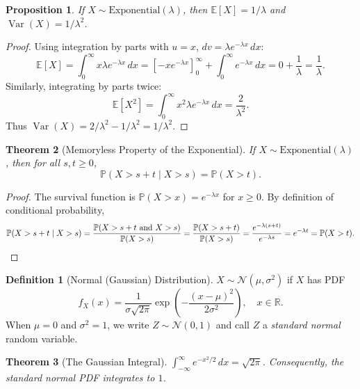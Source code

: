 \documentclass[11pt,a4paper]{article}
\theoremstyle{definition}
\newtheorem{definition}{Definition}[section]
\theoremstyle{plain}
\newtheorem{theorem}{Theorem}[section]
\newtheorem{proposition}[theorem]{Proposition}
\theoremstyle{remark}
\newcommand{\R}{\mathbb{R}}
\newcommand{\E}{\mathbb{E}}
\newcommand{\Prob}{\mathbb{P}}
\DeclareMathOperator{\Var}{Var}
\begin{document}
\begin{proposition}
\label{prop:exponential_moments}
If $X \sim \mathrm{Exponential}(\lambda)$, then $\E[X] = 1/\lambda$ and
$\Var(X) = 1/\lambda^2$.
\end{proposition}

\begin{proof}
Using integration by parts with $u = x$, $dv = \lambda e^{-\lambda x}\,dx$:
\[
    \E[X] = \int_0^\infty x \lambda e^{-\lambda x}\,dx
    = \left[-x e^{-\lambda x}\right]_0^\infty + \int_0^\infty e^{-\lambda x}\,dx
    = 0 + \frac{1}{\lambda} = \frac{1}{\lambda}.
\]
Similarly, integrating by parts twice:
\[
    \E[X^2] = \int_0^\infty x^2 \lambda e^{-\lambda x}\,dx = \frac{2}{\lambda^2}.
\]
Thus $\Var(X) = 2/\lambda^2 - 1/\lambda^2 = 1/\lambda^2$.
\end{proof}

\begin{theorem}[Memoryless Property of the Exponential]
\label{thm:memoryless}
If $X \sim \mathrm{Exponential}(\lambda)$, then for all $s, t \geq 0$,
\[
    \Prob(X > s + t \mid X > s) = \Prob(X > t).
\]
\end{theorem}

\begin{proof}
The survival function is $\Prob(X > x) = e^{-\lambda x}$ for $x \geq 0$. By definition
of conditional probability,
\[
    \Prob(X > s + t \mid X > s) = \frac{\Prob(X > s + t \text{ and } X > s)}{\Prob(X > s)}
    = \frac{\Prob(X > s + t)}{\Prob(X > s)} = \frac{e^{-\lambda(s+t)}}{e^{-\lambda s}}
    = e^{-\lambda t} = \Prob(X > t).
    \qedhere
\]
\end{proof}

\begin{definition}[Normal (Gaussian) Distribution]
\label{def:normal}
$X \sim \mathcal{N}(\mu, \sigma^2)$ if $X$ has PDF
\[
    f_X(x) = \frac{1}{\sigma\sqrt{2\pi}} \exp\!\left(-\frac{(x - \mu)^2}{2\sigma^2}\right),
    \quad x \in \R.
\]
When $\mu = 0$ and $\sigma^2 = 1$, we write $Z \sim \mathcal{N}(0,1)$ and call $Z$ a
\emph{standard normal} random variable.
\end{definition}

\begin{theorem}[The Gaussian Integral]
\label{thm:gaussian_integral}
$\displaystyle \int_{-\infty}^\infty e^{-x^2/2}\,dx = \sqrt{2\pi}$.
Consequently, the standard normal PDF integrates to $1$.
\end{theorem}
\end{document}
